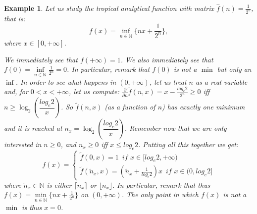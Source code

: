 \documentclass[submission,copyright,creativecommons]{eptcs}
\newtheorem{Example}[theorem]{Example}
\newcommand{\N}{\mathbb{N}}
\newcommand{\set}[1]{\{#1\}}
\begin{document}
\begin{Example}
Let us study the tropical analytical function with matrix $\hat f(n)=\frac{1}{2^n}$, that is:
\[
 f(x)=\inf\limits_{n\in\N} \set{nx+ \frac{1}{2^n}},
\]
where $x\in [0,+\infty]$.

We immediately see that $f(+\infty)=1$.
We also immediately see that $f(0)=\inf\limits_{n\in\N} \frac{1}{2^n}=0$.
In particular, remark that $f(0)$ is \emph{not} a $\min$ but only an $\inf$.
In order to see what happens in $(0,+\infty)$, let us treat $n$ as a real variable and, for $0<x<+\infty$, let us compute:
$\frac{\partial}{\partial n}\widetilde f(n,x) = x-\frac{log_e 2}{2^n}\geq 0$ iff $n\geq \log_2 \left(\dfrac{log_e 2}{x}\right)$.
So $\widetilde f(n,x)$ (as a function of $n$) has exactly one minimum and it is reached at $n_x=\log_2 \left(\dfrac{log_e 2}{x}\right)$.
Remember now that we are only interested in $n\geq 0$, and $n_x\geq 0$ iff $x\leq log_e 2$.
Putting all this together we get:
\[f(x)=\begin{cases}
\widetilde f(0,x) = 1 \, \textit{ if } x\in [log_e 2,+\infty) \\
\widetilde f(\widetilde n_x,x) = (\widetilde n_x+\frac{1}{log_e 2})x \, \textit{ if } x\in (0,log_e 2]
\end{cases}\]
where $\widetilde n_x\in\N$ is either $\lceil n_x \rceil$ or $\lfloor n_x \rfloor$.
In particular, remark that thus $f(x)=\min\limits_{n\in\N} \set{nx+ \frac{1}{2^n}}$ on $(0,+\infty)$.
The only point in which $f(x)$ is \emph{not} a $\min$ is thus $x=0$.


\end{Example}
\end{document}
